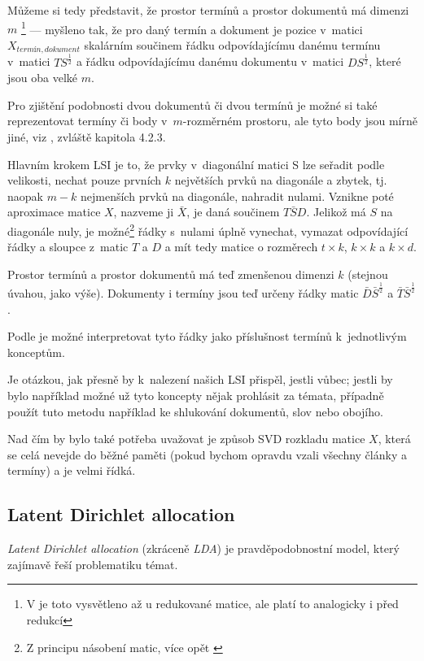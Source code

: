 \documentclass[12pt,a4paper]{report}
\begin{document}
Můžeme si tedy představit, že prostor termínů a prostor dokumentů má dimenzi $m$ \footnote{V \cite{lsi} je toto vysvětleno až u redukované matice, ale platí to analogicky i před redukcí} --- myšleno tak, že pro daný termín a dokument je pozice v~matici $X_{termín, dokument}$ skalárním součinem řádku odpovídajícímu danému termínu v~matici $TS^{\frac{1}{2}}$ a řádku odpovídajícímu danému dokumentu v~matici $DS^{\frac{1}{2}}$, které jsou oba velké $m$. 

Pro zjištění podobnosti dvou dokumentů či dvou termínů je možné si také reprezentovat termíny či body v~$m$-rozměrném prostoru, ale tyto body jsou mírně jiné, viz \cite{lsi}, zvláště kapitola 4.2.3.

Hlavním krokem LSI je to, že prvky v~diagonální matici S lze seřadit podle velikosti, nechat pouze prvních $k$ největších prvků na diagonále a zbytek, tj. naopak $m-k$ nejmenších prvků na diagonále, nahradit nulami. Vznikne poté aproximace matice $X$, nazveme ji $\bar{X}$, je daná součinem $T\bar{S}D$. Jelikož má $S$ na diagonále nuly, je možné\footnote{Z principu násobení matic, více opět \cite{lsi}} řádky s~nulami úplně vynechat, vymazat odpovídající řádky a sloupce z~matic $T$ a $D$ a mít tedy matice o rozměrech $t \times k$, $k \times k$ a $k \times d$.

Prostor termínů a prostor dokumentů má teď zmenšenou dimenzi $k$ (stejnou úvahou, jako výše). Dokumenty i termíny jsou teď určeny řádky matic $\bar{D}\bar{S}^{\frac{1}{2}}$ a $\bar{T}\bar{S}^{\frac{1}{2}}$.

Podle \cite{lsi} je možné interpretovat tyto řádky jako příslušnost termínů k~jednotlivým konceptům.

Je otázkou, jak přesně by k~nalezení našich  LSI přispěl, jestli vůbec; jestli by bylo například možné už tyto koncepty nějak prohlásit za témata, případně použít tuto metodu například ke shlukování dokumentů, slov nebo obojího.


Nad čím by bylo také potřeba uvažovat je způsob SVD rozkladu matice $X$, která se celá nevejde do běžné paměti (pokud bychom opravdu vzali všechny články a termíny) a je velmi řídká. 


\subsection{Latent Dirichlet allocation}
\emph{Latent Dirichlet allocation} (zkráceně \emph{LDA}) je pravděpodobnostní model, který zajímavě řeší problematiku témat.
\end{document}
